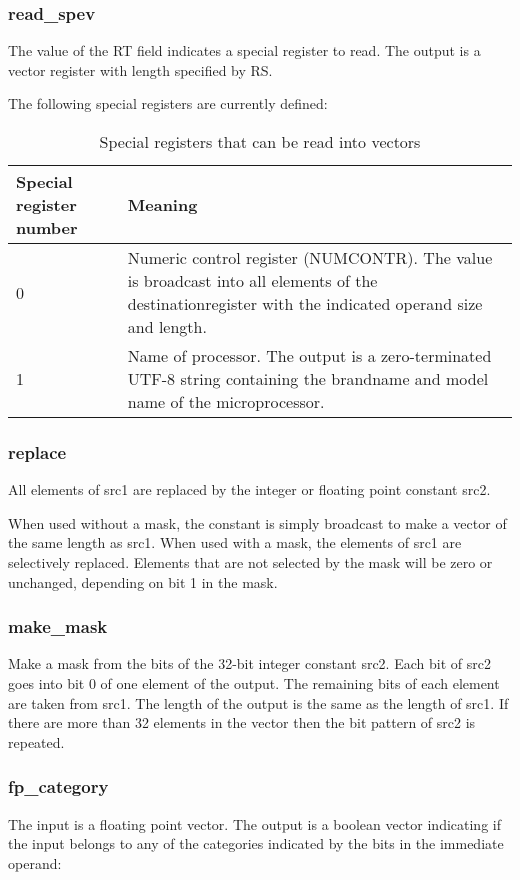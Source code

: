 \documentclass[forwardcom.tex]{subfiles}
\begin{document}
\subsubsection{read\_spev}
The value of the RT field indicates a special register to read. The output is a vector register with length specified by RS.
\vspace{2mm}

The following special registers are currently defined:

\begin{longtable} {|p{15mm}|p{100mm}|}
\caption{Special registers that can be read into vectors} 
\label{table:specialVectorRegisters} \\
\endfirsthead
\endhead
\hline
\bfseries Special register number & \bfseries Meaning  \\
\hline
0 & Numeric control register (NUMCONTR). The value is broadcast into all elements of the destinationregister with the indicated operand size and length.  \\
\hline
1 & Name of processor. The output is a zero-terminated UTF-8 string containing the brandname and model name of the microprocessor. \\
\hline
\end{longtable}

\subsubsection{replace}
All elements of src1 are replaced by the integer or floating point constant src2.
\vspace{2mm}

When used without a mask, the constant is simply broadcast to make a vector of the same length as src1. When used with a mask, the elements of src1 are selectively replaced. Elements that are not selected by the mask will be zero or unchanged, depending on bit 1 in the mask.

\subsubsection{make\_mask}
Make a mask from the bits of the 32-bit integer constant src2. Each bit of src2 goes into bit 0 of one element of the output. The remaining bits of each element are taken from src1. The length of the output is the same as the length of src1. If there are more than 32 elements in the vector then the bit pattern of src2 is repeated.


\subsubsection{fp\_category}
The input is a floating point vector. The output is a boolean vector indicating if the input belongs to any of the categories indicated by the bits in the immediate operand:
\end{document}
